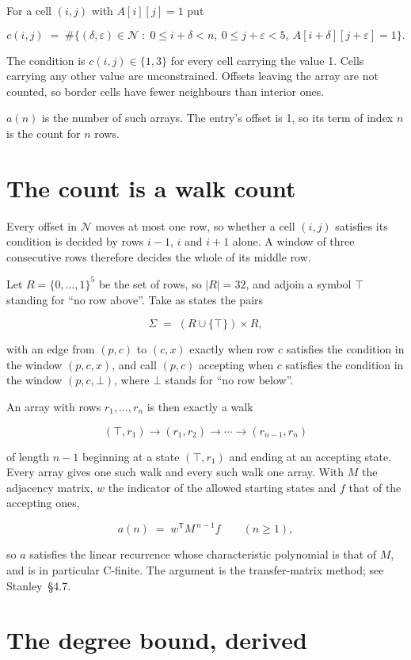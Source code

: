 \documentclass[11pt]{article}
\theoremstyle{definition}
\begin{document}
For a cell $(i,j)$ with $A[i][j] = 1$ put

\[c(i,j) \;=\; \#\bigl\{(\delta,\varepsilon)\in\mathcal{N} \;:\; 0\le i+\delta<n,\ 0\le j+\varepsilon<5,\ A[i+\delta][j+\varepsilon] = 1\bigr\}.\]

The condition is $c(i,j) \in \{1, 3\}$ for every cell carrying the value 1. Cells carrying any other value are unconstrained. Offsets leaving the array are not counted, so border cells have fewer neighbours than interior ones.

$a(n)$ is the number of such arrays. The entry's offset is 1, so its term of index $n$ is the count for $n$ rows.

\section{The count is a walk count}

Every offset in $\mathcal{N}$ moves at most one row, so whether a cell $(i,j)$ satisfies its condition is decided by rows $i-1$, $i$ and $i+1$ alone. A window of three consecutive rows therefore decides the whole of its middle row.

Let $R = \{0,\dots,1\}^{5}$ be the set of rows, so $|R| = 32$, and adjoin a symbol $\top$ standing for ``no row above''. Take as states the pairs

\[\Sigma \;=\; (R \cup \{\top\}) \times R,\]

with an edge from $(p,c)$ to $(c,x)$ exactly when row $c$ satisfies the condition in the window $(p,c,x)$, and call $(p,c)$ accepting when $c$ satisfies the condition in the window $(p,c,\bot)$, where $\bot$ stands for ``no row below''.

An array with rows $r_1,\dots,r_n$ is then exactly a walk

\[(\top,r_1) \to (r_1,r_2) \to \cdots \to (r_{n-1},r_n)\]

of length $n-1$ beginning at a state $(\top,r_1)$ and ending at an accepting state. Every array gives one such walk and every such walk one array. With $M$ the adjacency matrix, $w$ the indicator of the allowed starting states and $f$ that of the accepting ones,

\[a(n) \;=\; w^{\mathsf T} M^{\,n-1} f \qquad (n \ge 1),\]

so $a$ satisfies the linear recurrence whose characteristic polynomial is that of $M$, and is in particular C-finite. The argument is the transfer-matrix method; see Stanley~\S4.7.

\section{The degree bound, derived}
\end{document}
